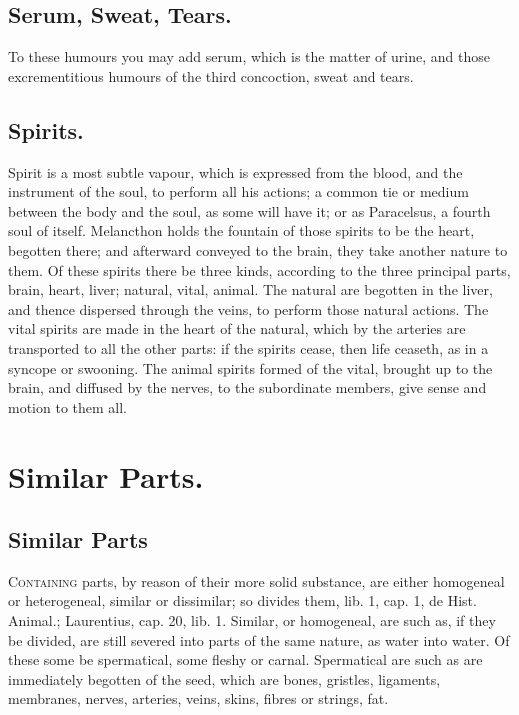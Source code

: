 {\subsection{Serum, Sweat, Tears.}
To these humours you may add serum, which is
the matter of urine, and those excrementitious humours of the third
concoction, sweat and tears.

\subsection{Spirits.}
Spirit is a most subtle vapour, which is expressed from the
blood, and the instrument of the soul, to perform all his actions; a
common tie or medium between the body and the soul, as some will have
it; or as Paracelsus, a fourth soul of itself. Melancthon holds
the fountain of those spirits to be the heart, begotten there; and
afterward conveyed to the brain, they take another nature to them. Of
these spirits there be three kinds, according to the three principal
parts, brain, heart, liver; natural, vital, animal. The natural are
begotten in the liver, and thence dispersed through the veins, to
perform those natural actions. The vital spirits are made in the heart
of the natural, which by the arteries are transported to all the other
parts: if the spirits cease, then life ceaseth, as in a syncope or
swooning. The animal spirits formed of the vital, brought up to the
brain, and diffused by the nerves, to the subordinate members, give
sense and motion to them all.

\section{Similar Parts.}

\subsection{Similar Parts}
\lettrine{C}{ontaining} parts, by reason of their more solid
substance, are either homogeneal or heterogeneal, similar or
dissimilar; so \Aristotle divides them, lib. 1, cap. 1, de Hist.
Animal.; Laurentius, cap. 20, lib. 1. Similar, or homogeneal, are such
as, if they be divided, are still severed into parts of the same
nature, as water into water. Of these some be spermatical, some fleshy
or carnal. Spermatical are such as are immediately begotten of the
seed, which are bones, gristles, ligaments, membranes, nerves,
arteries, veins, skins, fibres or strings, fat.

}
